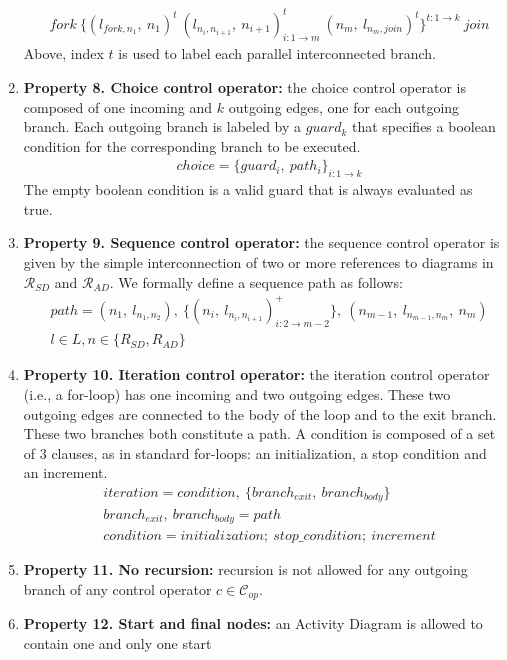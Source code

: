 \documentclass{llncs}
\begin{document}
\begin{subappendices}
\begin{enumerate}
\begin{align*}
		&fork\ \{(l_{fork,n_1},\ n_1)^t\ (l_{n_i,n_{i+1}},\ n_{i+1})^t_{i:1 \rightarrow m}\
		(n_{m},\ l_{n_m,join})^t\}^{t:1 \rightarrow k}\ join
		\end{align*}
	Above, index $t$ is used to label each parallel interconnected branch.
	\item \textbf{Property 8. Choice control operator:} the choice control operator is composed of one incoming and $k$
	outgoing edges, one for each outgoing branch. Each outgoing branch is labeled by a $guard_k$ that specifies a
	boolean condition for the corresponding branch to be executed.
		\begin{align*}
		&choice = \{guard_i,\ path_i\}_{i:1 \rightarrow k}
		\end{align*}
	The empty boolean condition is a valid guard that is always evaluated as true.
	\item \textbf{Property 9. Sequence control operator:} the sequence control operator is given by the simple
	interconnection of two or more references to diagrams in $\mathcal{R}_{SD}$ and $\mathcal{R}_{AD}$. We formally
	define a sequence path as follows:
		\begin{align*}
		&path = (n_1,\ l_{n_1,n_2}),\ \{(n_i,\ l_{n_i,n_{i+1}})^{+}_{i:2 \rightarrow m-2}\},\ (n_{m-1},\ l_{n_{m-1},n_{m}},\
		n_m)\\
		&l \in L, n \in \{R_{SD}, R_{AD}\}
		\end{align*}
	\item \textbf{Property 10. Iteration control operator:} the iteration control operator (i.e., a for-loop) has one
	incoming and two outgoing edges. These two outgoing edges are connected to the body of the loop and to the exit
	branch. These two branches both constitute a path. A condition is composed of a set of 3 clauses, as in standard
	for-loops: an initialization, a stop condition and an increment.
		\begin{align*}
		&iteration = condition,\ \{branch_{exit},\ branch_{body} \}\\
		&branch_{exit},\ branch_{body} = path\\
		&condition = initialization;\ stop\_condition;\ increment
		\end{align*}
	\item \textbf{Property 11. No recursion:} recursion is not allowed for any outgoing	branch of any control operator
	$c \in \mathcal{C}_{op}$.
	\item \textbf{Property 12. Start and final nodes:} an Activity Diagram is allowed to contain one and only one start

\end{enumerate}
\end{subappendices}
\end{document}
